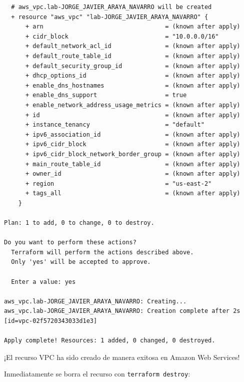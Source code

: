 \documentclass[11pt]{article}
\begin{document}
\begin{verbatim}
  # aws_vpc.lab-JORGE_JAVIER_ARAYA_NAVARRO will be created
  + resource "aws_vpc" "lab-JORGE_JAVIER_ARAYA_NAVARRO" {
      + arn                                  = (known after apply)
      + cidr_block                           = "10.0.0.0/16"
      + default_network_acl_id               = (known after apply)
      + default_route_table_id               = (known after apply)
      + default_security_group_id            = (known after apply)
      + dhcp_options_id                      = (known after apply)
      + enable_dns_hostnames                 = (known after apply)
      + enable_dns_support                   = true
      + enable_network_address_usage_metrics = (known after apply)
      + id                                   = (known after apply)
      + instance_tenancy                     = "default"
      + ipv6_association_id                  = (known after apply)
      + ipv6_cidr_block                      = (known after apply)
      + ipv6_cidr_block_network_border_group = (known after apply)
      + main_route_table_id                  = (known after apply)
      + owner_id                             = (known after apply)
      + region                               = "us-east-2"
      + tags_all                             = (known after apply)
    }

Plan: 1 to add, 0 to change, 0 to destroy.

Do you want to perform these actions?
  Terraform will perform the actions described above.
  Only 'yes' will be accepted to approve.

  Enter a value: yes

aws_vpc.lab-JORGE_JAVIER_ARAYA_NAVARRO: Creating...
aws_vpc.lab-JORGE_JAVIER_ARAYA_NAVARRO: Creation complete after 2s [id=vpc-02f5720343033d1e3]

Apply complete! Resources: 1 added, 0 changed, 0 destroyed.
\end{verbatim}

¡El recurso VPC ha sido creado de manera exitosa en Amazon Web Services!

Inmediatamente se borra el recurso con \texttt{terraform destroy}:
\end{document}
